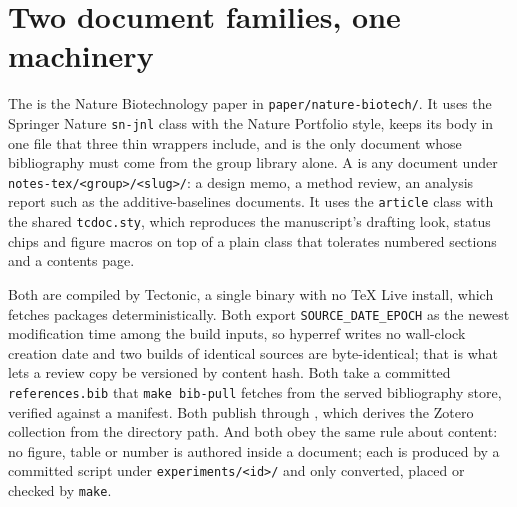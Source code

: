 
\section{Two document families, one machinery}
\label{sec:families}

The  is the Nature Biotechnology paper in
\texttt{paper/nature-biotech/}. It uses the Springer Nature \texttt{sn-jnl} class
with the Nature Portfolio style, keeps its body in one file that three thin
wrappers include, and is the only document whose bibliography must come from the
group library alone. A  is any document under
\texttt{notes-tex/<group>/<slug>/}: a design memo, a method review, an analysis report such
as the additive-baselines documents. It uses the \texttt{article} class with the
shared \texttt{tcdoc.sty}, which reproduces the manuscript's drafting look, status
chips and figure macros on top of a plain class that tolerates numbered sections
and a contents page.

Both are compiled by Tectonic, a single binary with no TeX Live install, which
fetches packages deterministically. Both export \texttt{SOURCE\_DATE\_EPOCH} as the
newest modification time among the build inputs, so hyperref writes no wall-clock
creation date and two builds of identical sources are byte-identical; that is what
lets a review copy be versioned by content hash. Both take a committed
\texttt{references.bib} that \texttt{make bib-pull} fetches from the served
bibliography store, verified against a manifest. Both publish through
, which derives the Zotero collection from
the directory path. And both obey the same rule about content: no figure, table or
number is authored inside a document; each is produced by a committed script under
\texttt{experiments/<id>/} and only converted, placed or checked by \texttt{make}.


